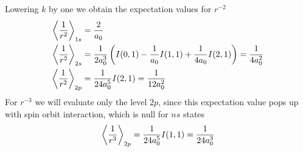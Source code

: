 \documentclass[../qm.tex]{subfiles}
\begin{document}
	Lowering $k$ by one we obtain the expectation values for $r^{-2}$
	\begin{equation}
		\begin{aligned}
			\expval{\frac{1}{r^2}}_{1s}&=\frac{2}{a_0}\\
			\expval{\frac{1}{r^2}}_{2s}&=\frac{1}{2a_0^3}\left( I(0,1)-\frac{1}{a_0}I(1,1)+\frac{1}{4a_0}I(2,1) \right)=\frac{1}{4a_0^2}\\
			\expval{\frac{1}{r^2}}_{2p}&=\frac{1}{24a_0^5}I(2,1)=\frac{1}{12a_0^2}
		\end{aligned}
		\label{eq:rminustwoapp}
	\end{equation}
	For $r^{-3}$ we will evaluate only the level $2p$, since this expectation value pops up with spin orbit interaction, which is null for $ns$ states
	\begin{equation}
		\expval{\frac{1}{r^3}}_{2p}=\frac{1}{24a_0^5}I(1,1)=\frac{1}{24a_0^3}
		\label{eq:rminusthreeapp}
	\end{equation}
\end{document}
